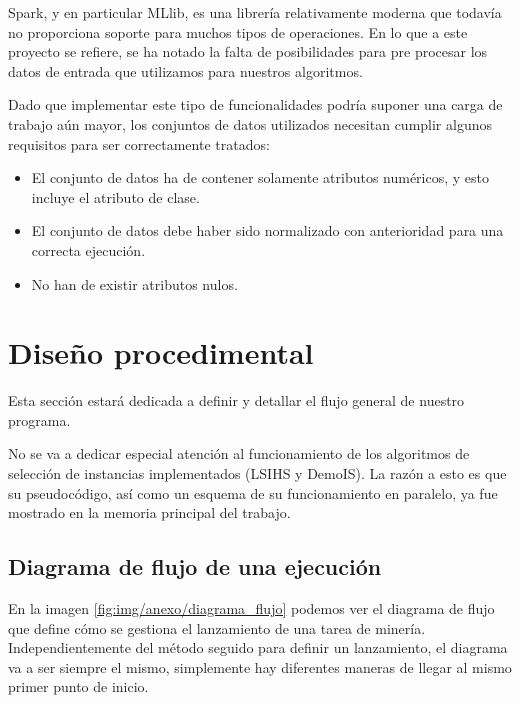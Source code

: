 Spark, y en particular MLlib, es una librería relativamente moderna que todavía no proporciona soporte para muchos tipos de operaciones. En lo que a este proyecto se refiere, se ha notado la falta de posibilidades para pre procesar los datos de entrada que utilizamos para nuestros algoritmos.

Dado que implementar este tipo de funcionalidades podría suponer una carga de trabajo aún mayor, los conjuntos de datos utilizados necesitan cumplir algunos requisitos para ser correctamente tratados:

\begin{itemize}
\item El conjunto de datos ha de contener solamente atributos numéricos, y esto incluye el atributo de clase.
\item El conjunto de datos debe haber sido normalizado con anterioridad para una correcta ejecución.
\item No han de existir atributos nulos.
\end{itemize}

\section{Diseño procedimental}

Esta sección estará dedicada a definir y detallar el flujo general de nuestro programa.

No se va a dedicar especial atención al funcionamiento de los algoritmos de selección de instancias implementados (LSIHS y DemoIS). La razón a esto es que su pseudocódigo, así como un esquema de su funcionamiento en paralelo, ya fue mostrado en la memoria principal del trabajo.

\subsection{Diagrama de flujo de una ejecución}

En la imagen \ref{fig:img/anexo/diagrama_flujo} podemos ver el diagrama de flujo que define cómo se gestiona el lanzamiento de una tarea de minería. Independientemente del método seguido para definir un lanzamiento, el diagrama va a ser siempre el mismo, simplemente hay diferentes maneras de llegar al mismo primer punto de inicio.


